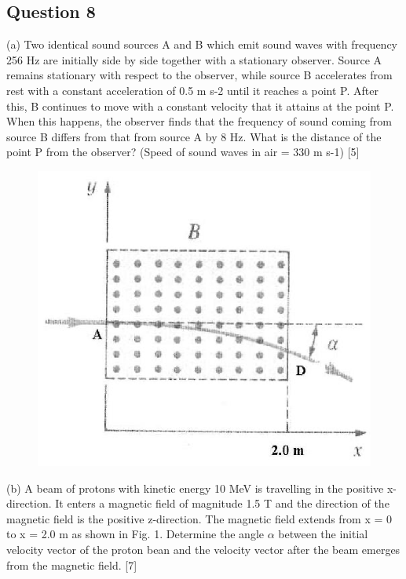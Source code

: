 \documentclass{article}
\begin{document}
\subsection{Question 8}
(a) Two identical sound sources A and B which emit sound waves with frequency 256 Hz are initially side by side together with a stationary observer. Source A remains stationary with respect to the observer, while source B accelerates from rest with a constant acceleration of 0.5 m s-2 until it reaches a point P. After this, B continues to move with a constant velocity that it attains at the point P. When this happens, the observer finds that the frequency of sound coming from source B differs from that from source A by 8 Hz. What is the distance of the point P from the observer? (Speed of sound waves in air = 330 m s-1) [5] \\
\begin{figure}
	\centering
	\includegraphics[width=\linewidth]{spho_book_TYS_images/2020q8}
\end{figure}
(b) A beam of protons with kinetic energy 10 MeV is travelling in the positive x-direction. It enters a magnetic field of magnitude 1.5 T and the direction of the magnetic field is the positive z-direction. The magnetic field extends from x = 0 to x = 2.0 m as shown in Fig. 1. Determine the angle $\alpha$ between the initial velocity vector of the proton bean and the velocity vector after the beam emerges from the magnetic field. [7] \\
\end{document}
